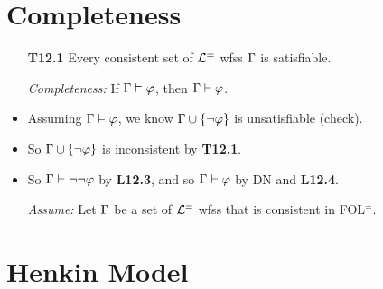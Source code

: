 \documentclass[a4paper, 11pt]{article} %
\begin{document}
\section*{Completeness}

\begin{itemize}
  \item[\bf T12.1] Every consistent set of $\mathcal{L}^=$ wfss $\Gamma$ is satisfiable.
  \item[\it Completeness:] If $\Gamma\vDash\varphi$, then $\Gamma\vdash\varphi$.
  \item Assuming $\Gamma\vDash\varphi$, we know $\Gamma\cup\lbrace\neg\varphi\rbrace$ is unsatisfiable (check).
  \item So $\Gamma\cup\lbrace\neg\varphi\rbrace$ is inconsistent by \textbf{T12.1}.
  \item So $\Gamma\vdash\neg\neg\varphi$ by \textbf{L12.3}, and so $\Gamma\vdash\varphi$ by DN and \textbf{L12.4}.
  \item[\it Assume:] Let $\Gamma$ be a set of $\mathcal{L}^=$ wfss that is consistent in FOL$^=$.
\end{itemize}





\section*{Henkin Model}
\end{document}
